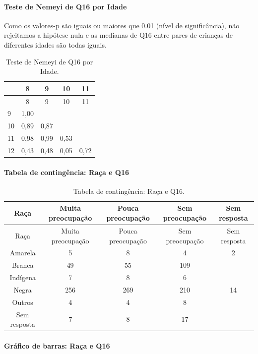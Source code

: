 \documentclass[]{article}
\let\oldparagraph\paragraph
\renewcommand{\paragraph}[1]{\oldparagraph{#1}\mbox{}}
\begin{document}
\hypertarget{teste-de-nemeyi-de-q16-por-idade}{%
\paragraph{Teste de Nemeyi de Q16 por Idade}\label{teste-de-nemeyi-de-q16-por-idade}}

Como os valores-p são iguais ou maiores que 0.01 (nível de significância), não rejeitamos a hipótese nula e as medianas de Q16 entre pares de crianças de diferentes idades são todas iguais.

\begin{longtable}[]{@{}lcccc@{}}
\caption{\label{tab:unnamed-chunk-160}Teste de Nemeyi de Q16 por Idade.}\tabularnewline
\toprule
& 8 & 9 & 10 & 11\tabularnewline
\midrule
\endfirsthead
\toprule
& 8 & 9 & 10 & 11\tabularnewline
\midrule
\endhead
9 & 1,00 & & &\tabularnewline
10 & 0,89 & 0,87 & &\tabularnewline
11 & 0,98 & 0,99 & 0,53 &\tabularnewline
12 & 0,43 & 0,48 & 0,05 & 0,72\tabularnewline
\bottomrule
\end{longtable}

\cleardoublepage

\hypertarget{tabela-de-continguxeancia-rauxe7a-e-q16}{%
\paragraph{Tabela de contingência: Raça e Q16}\label{tabela-de-continguxeancia-rauxe7a-e-q16}}

\begin{longtable}[]{@{}ccccc@{}}
\caption{\label{tab:unnamed-chunk-161}Tabela de contingência: Raça e Q16.}\tabularnewline
\toprule
Raça & Muita preocupação & Pouca preocupação & Sem preocupação & Sem resposta\tabularnewline
\midrule
\endfirsthead
\toprule
Raça & Muita preocupação & Pouca preocupação & Sem preocupação & Sem resposta\tabularnewline
\midrule
\endhead
Amarela & 5 & 8 & 4 & 2\tabularnewline
Branca & 49 & 55 & 109 &\tabularnewline
Indígena & 7 & 8 & 6 &\tabularnewline
Negra & 256 & 269 & 210 & 14\tabularnewline
Outros & 4 & 4 & 8 &\tabularnewline
Sem resposta & 7 & 8 & 17 &\tabularnewline
\bottomrule
\end{longtable}

\hypertarget{gruxe1fico-de-barras-rauxe7a-e-q16}{%
\paragraph{Gráfico de barras: Raça e Q16}\label{gruxe1fico-de-barras-rauxe7a-e-q16}}
\end{document}
